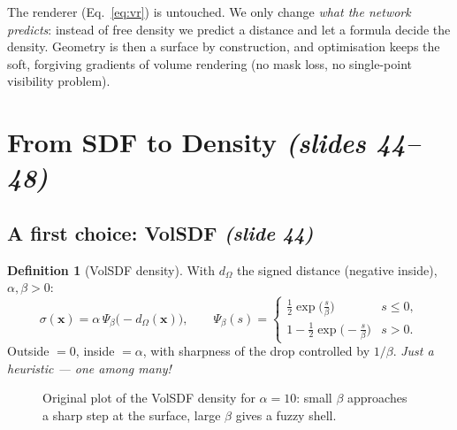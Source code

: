 \documentclass[11pt,a4paper]{article}
\newcommand{\bx}{\bm{x}}
\theoremstyle{definition}
\newtheorem{definition}{Definition}[section]
\theoremstyle{plain}
\theoremstyle{remark}
\begin{document}
\begin{intuition}
The renderer (Eq.~\eqref{eq:vr}) is untouched. We only change \emph{what the network predicts}: instead of free density
we predict a distance and let a formula decide the density. Geometry is then a surface by construction, and optimisation
keeps the soft, forgiving gradients of volume rendering (no mask loss, no single-point visibility problem).
\end{intuition}

\section{From SDF to Density \emph{(slides 44--48)}}
\subsection{A first choice: VolSDF \emph{(slide 44)}}
\begin{definition}[VolSDF density]\label{def:volsdf}
With $d_\Omega$ the signed distance (negative inside), $\alpha,\beta>0$:
\[
\sigma(\bx)=\alpha\,\Psi_\beta\bigl(-d_\Omega(\bx)\bigr),\qquad
\Psi_\beta(s)=\begin{cases}\tfrac12\exp\!\bigl(\tfrac{s}{\beta}\bigr)& s\le0,\\[2pt]
1-\tfrac12\exp\!\bigl(-\tfrac{s}{\beta}\bigr)& s>0.\end{cases}
\]
Outside $=0$, inside $=\alpha$, with sharpness of the drop controlled by $1/\beta$. \emph{Just a heuristic --- one among many!}
\end{definition}

\begin{figure}[htbp]
\centering
{}
\caption{Original plot of the VolSDF density for $\alpha=10$: small $\beta$ approaches a sharp step at the surface, large $\beta$ gives a fuzzy shell.}
\end{figure}
\end{document}
